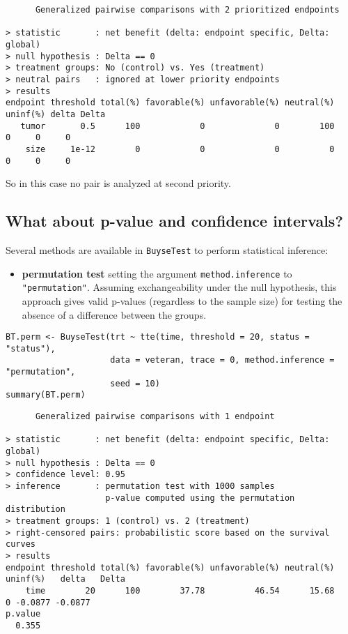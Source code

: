 \documentclass[12pt]{article}
\begin{document}
\begin{verbatim}
      Generalized pairwise comparisons with 2 prioritized endpoints

> statistic       : net benefit (delta: endpoint specific, Delta: global) 
> null hypothesis : Delta == 0 
> treatment groups: No (control) vs. Yes (treatment) 
> neutral pairs   : ignored at lower priority endpoints
> results
endpoint threshold total(%) favorable(%) unfavorable(%) neutral(%) uninf(%) delta Delta
   tumor       0.5      100            0              0        100        0     0     0
    size     1e-12        0            0              0          0        0     0     0
\end{verbatim}

So in this case no pair is analyzed at second priority.

\clearpage

\subsection{What about p-value and confidence intervals?}
\label{sec:org895d63a}

Several methods are available in \texttt{BuyseTest} to perform statistical inference:
\begin{itemize}
\item \textbf{permutation test} setting the argument \texttt{method.inference} to
\texttt{"permutation"}. Assuming exchangeability under the null hypothesis,
this approach gives valid p-values (regardless to the sample size)
for testing the absence of a difference between the groups.
\end{itemize}
\lstset{language=r,label= ,caption= ,captionpos=b,numbers=none}
\begin{lstlisting}
BT.perm <- BuyseTest(trt ~ tte(time, threshold = 20, status = "status"),
					 data = veteran, trace = 0, method.inference = "permutation",
					 seed = 10) 
summary(BT.perm)
\end{lstlisting}

\begin{verbatim}
      Generalized pairwise comparisons with 1 endpoint

> statistic       : net benefit (delta: endpoint specific, Delta: global) 
> null hypothesis : Delta == 0 
> confidence level: 0.95 
> inference       : permutation test with 1000 samples 
                    p-value computed using the permutation distribution 
> treatment groups: 1 (control) vs. 2 (treatment) 
> right-censored pairs: probabilistic score based on the survival curves
> results
endpoint threshold total(%) favorable(%) unfavorable(%) neutral(%) uninf(%)   delta   Delta
    time        20      100        37.78          46.54      15.68        0 -0.0877 -0.0877
p.value 
  0.355
\end{verbatim}
\end{document}
